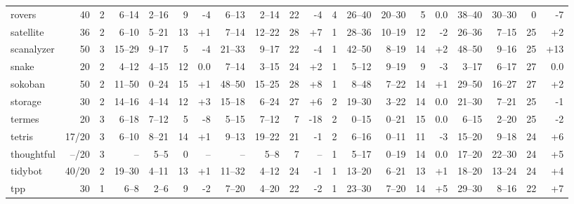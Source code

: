 \documentclass{article}
\begin{document}
\begin{table}
\begin{tabular}{l@{}rr|rrrr|rrrr|r|rrrr|rrrr}
       rovers &    40 &   2 &   6--14 &  2--16 &  9 &  {\color{red}-4} &   6--13 &  2--14 & 22 &   {\color{red}-4} &   4 &   26--40 & 20--30 &  5 &               0.0 &   38--40 & 30--30 &  0 &   {\color{red}-7} \\
    satellite &    36 &   2 &   6--10 &  5--21 & 13 & {\color{blue}+1} &   7--14 & 12--22 & 28 &  {\color{blue}+7} &   1 &   28--36 & 10--19 & 12 &   {\color{red}-2} &   26--36 &  7--15 & 25 &  {\color{blue}+2} \\
   scanalyzer &    50 &   3 &  15--29 &  9--17 &  5 &  {\color{red}-4} &  21--33 &  9--17 & 22 &   {\color{red}-4} &   1 &   42--50 &  8--19 & 14 &  {\color{blue}+2} &   48--50 &  9--16 & 25 & {\color{blue}+13} \\
        snake &    20 &   2 &   4--12 &  4--15 & 12 &              0.0 &   7--14 &  3--15 & 24 &  {\color{blue}+2} &   1 &    5--12 &  9--19 &  9 &   {\color{red}-3} &    3--17 &  6--17 & 27 &               0.0 \\
      sokoban &    50 &   2 &  11--50 &  0--24 & 15 & {\color{blue}+1} &  48--50 & 15--25 & 28 &  {\color{blue}+8} &   1 &    8--48 &  7--22 & 14 &  {\color{blue}+1} &   29--50 & 16--27 & 27 &  {\color{blue}+2} \\
      storage &    30 &   2 &  14--16 &  4--14 & 12 & {\color{blue}+3} &  15--18 &  6--24 & 27 &  {\color{blue}+6} &   2 &   19--30 &  3--22 & 14 &               0.0 &   21--30 &  7--21 & 25 &   {\color{red}-1} \\
       termes &    20 &   3 &   6--18 &  7--12 &  5 &  {\color{red}-8} &   5--15 &  7--12 &  7 &  {\color{red}-18} &   2 &    0--15 &  0--21 & 15 &               0.0 &    6--15 &  2--20 & 25 &   {\color{red}-2} \\
       tetris & 17/20 &   3 &   6--10 &  8--21 & 14 & {\color{blue}+1} &   9--13 & 19--22 & 21 &   {\color{red}-1} &   2 &    6--16 &  0--11 & 11 &   {\color{red}-3} &   15--20 &  9--18 & 24 &  {\color{blue}+6} \\
   thoughtful & --/20 &   3 &      -- &   5--5 &  0 &               -- &      -- &   5--8 &  7 &                -- &   1 &    5--17 &  0--19 & 14 &               0.0 &   17--20 & 22--30 & 24 &  {\color{blue}+5} \\
      tidybot & 40/20 &   2 &  19--30 &  4--11 & 13 & {\color{blue}+1} &  11--32 &  4--12 & 24 &   {\color{red}-1} &   1 &   13--20 &  6--21 & 13 &  {\color{blue}+1} &   18--20 & 13--24 & 24 &  {\color{blue}+4} \\
          tpp &    30 &   1 &    6--8 &   2--6 &  9 &  {\color{red}-2} &   7--20 &  4--20 & 22 &   {\color{red}-2} &   1 &   23--30 &  7--20 & 14 &  {\color{blue}+5} &   29--30 &  8--16 & 22 &  {\color{blue}+7} \\

\end{tabular}
\end{table}
\end{document}
